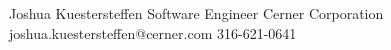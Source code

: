 %
%
%


\begin{referees}
		{Joshua Kuestersteffen}
		{Software Engineer}
		{Cerner Corporation}
		{joshua.kuestersteffen@cerner.com}
		{316-621-0641}
\end{referees}